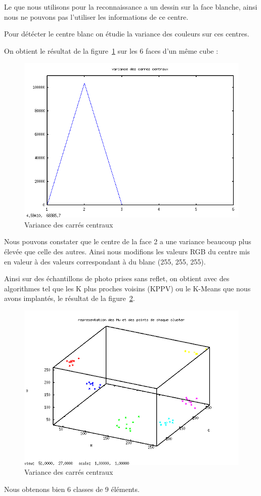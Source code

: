   Le \rubic{} que nous utilisons pour la reconnaissance a un dessin sur la face blanche, ainsi nous ne pouvons pas l'utiliser les informations de ce centre. 

  Pour détécter le centre blanc on étudie la variance des couleurs sur ces centres. 

  On obtient le résultat de la figure~\ref{fig:var} sur les 6 faces d'un même cube :
  \begin{figure}[!ht]
    \centering
    \includegraphics[width=0.5\linewidth]{./Images/var.png}
    \caption{Variance des carrés centraux}
    \label{fig:var}
   \end{figure}

  Nous pouvons constater que le centre de la face 2 a une variance beaucoup plus élevée que celle des autres. 
Ainsi nous modifions les valeurs RGB du centre mis en valeur à des valeurs correspondant à du blanc (255, 255, 255). 

  Ainsi sur des échantillons de photo prises sans reflet, on obtient avec des algorithmes tel que les K plus proches voisins (KPPV) ou le K-Means que nous avons implantés, le résultat de la figure~\ref{fig:RGBok}. 
  \begin{figure}[!ht]
    \centering
    \includegraphics[width=0.5\linewidth]{./Images/RGB_ok.png}
    \caption{Variance des carrés centraux}
    \label{fig:RGBok}
   \end{figure}

  Nous obtenons bien 6 classes de 9 éléments. 
